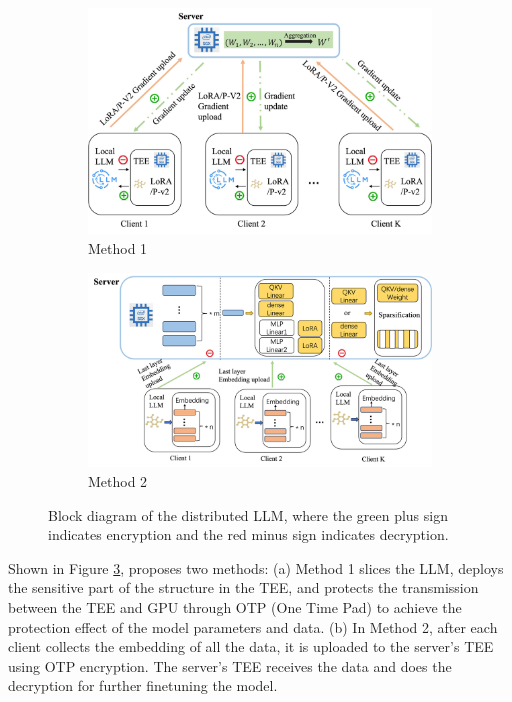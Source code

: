 \documentclass[lang=en]{sjtuarticle}
\begin{document}
\begin{figure}[h]
    \centering
    \begin{subfigure}{.45\textwidth}
        \centering
        \includegraphics{llmtee.jpg}
        \caption{Method 1}
        \label{fig:llmtee1}
    \end{subfigure}\hfill
    \begin{subfigure}{.45\textwidth}
        \centering
        \includegraphics[width=\textwidth]{llmtee2.jpg}
        \caption{Method 2}
        \label{fig:llmtee2}
    \end{subfigure}
    \caption{Block diagram of the distributed LLM, where the green plus sign indicates encryption and the red minus sign indicates decryption.}
    \label{fig:llmtee}
\end{figure}

Shown in Figure \ref{fig:llmtee}, \cite{huang2024fast} proposes two methods: (a) Method 1 slices the LLM, deploys the sensitive part of the
structure in the TEE, and protects the transmission between
the TEE and GPU through OTP (One Time Pad) \cite{tramer2018slalom} to achieve the protection effect
of the model parameters and data. (b) In Method 2, after each
client collects the embedding of all the data, it is uploaded
to the server's TEE using OTP encryption. The server's
TEE receives the data and does the decryption for further finetuning the
model.
\end{document}
